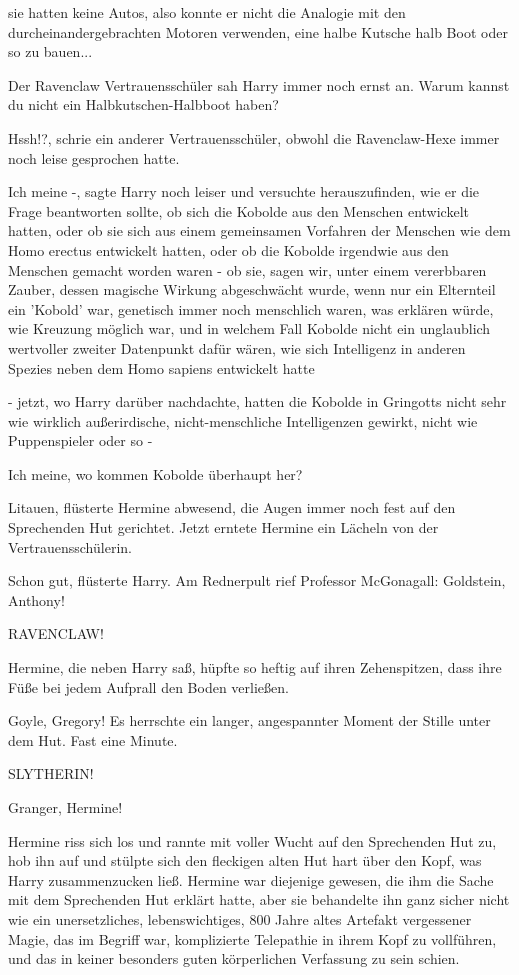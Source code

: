 sie hatten keine Autos, also konnte er nicht die Analogie mit den
durcheinandergebrachten Motoren verwenden, \glqq eine halbe Kutsche halb Boot
oder so zu bauen...\grqq{}

Der Ravenclaw Vertrauensschüler sah Harry immer noch ernst an. \glqq Warum
kannst du nicht ein Halbkutschen-Halbboot haben?\grqq{}

\glqq Hssh!?\grqq{}, schrie ein anderer Vertrauensschüler, obwohl die
Ravenclaw-Hexe immer noch leise gesprochen hatte.

\glqq Ich meine -\grqq{}, sagte Harry noch leiser und versuchte herauszufinden,
wie er die Frage beantworten sollte, ob sich die Kobolde aus den Menschen
entwickelt hatten, oder ob sie sich aus einem gemeinsamen Vorfahren der Menschen
wie dem Homo erectus entwickelt hatten, oder ob die Kobolde irgendwie aus den
Menschen gemacht worden waren - ob sie, sagen wir, unter einem vererbbaren
Zauber, dessen magische Wirkung abgeschwächt wurde, wenn nur ein Elternteil ein
'Kobold' war, genetisch immer noch menschlich waren, was erklären würde, wie
Kreuzung möglich war, und in welchem Fall Kobolde nicht ein unglaublich
wertvoller zweiter Datenpunkt dafür wären, wie sich Intelligenz in anderen
Spezies neben dem Homo sapiens entwickelt hatte

- jetzt, wo Harry darüber nachdachte, hatten die Kobolde in Gringotts nicht sehr
wie wirklich außerirdische, nicht-menschliche Intelligenzen gewirkt, nicht wie
Puppenspieler oder so -

\glqq Ich meine, wo kommen Kobolde überhaupt her? \glqq

\glqq Litauen\grqq{}, flüsterte Hermine abwesend, die Augen immer noch fest auf
den Sprechenden Hut gerichtet. Jetzt erntete Hermine ein Lächeln von der
Vertrauensschülerin.

\glqq Schon gut\grqq{}, flüsterte Harry. Am Rednerpult rief Professor
McGonagall: \glqq Goldstein, Anthony!\grqq{}

\glqq RAVENCLAW!\grqq{}

Hermine, die neben Harry saß, hüpfte so heftig auf ihren Zehenspitzen, dass ihre
Füße bei jedem Aufprall den Boden verließen.

\glqq Goyle, Gregory!\grqq{} Es herrschte ein langer, angespannter Moment der
Stille unter dem Hut. Fast eine Minute.

\glqq SLYTHERIN!\grqq{}

\glqq Granger, Hermine!\grqq{}

Hermine riss sich los und rannte mit voller Wucht auf den Sprechenden Hut zu,
hob ihn auf und stülpte sich den fleckigen alten Hut hart über den Kopf, was
Harry zusammenzucken ließ. Hermine war diejenige gewesen, die ihm die Sache mit
dem Sprechenden Hut erklärt hatte, aber sie behandelte ihn ganz sicher nicht wie
ein unersetzliches, lebenswichtiges, 800 Jahre altes Artefakt vergessener Magie,
das im Begriff war, komplizierte Telepathie in ihrem Kopf zu vollführen, und das
in keiner besonders guten körperlichen Verfassung zu sein schien.

